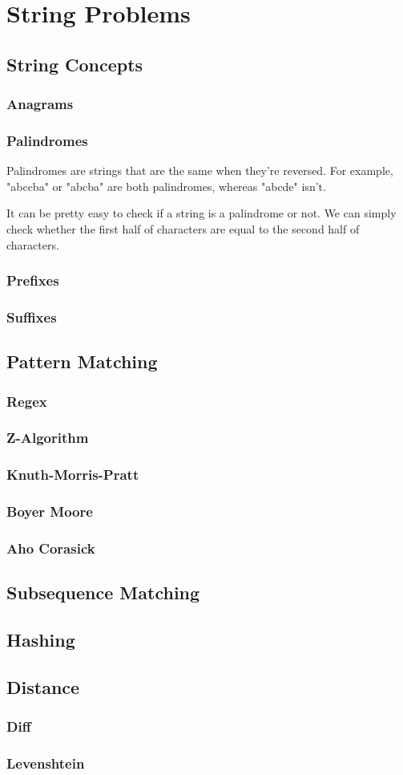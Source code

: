 \section{String Problems}
\subsection{String Concepts}
\subsubsection{Anagrams}
\subsubsection{Palindromes}

Palindromes are strings that are the same when they're reversed. For example, "abccba" or "abcba" are both palindromes, whereas "abcde" isn't.

It can be pretty easy to check if a string is a palindrome or not. We can simply check whether the first half of characters are equal to the second half of characters.

\subsubsection{Prefixes}
\subsubsection{Suffixes}
\subsection{Pattern Matching}
\subsubsection{Regex}
\subsubsection{Z-Algorithm}
\subsubsection{Knuth-Morris-Pratt}
\subsubsection{Boyer Moore}
\subsubsection{Aho Corasick}
\subsection{Subsequence Matching}
\subsection{Hashing}
\subsection{Distance}
\subsubsection{Diff}
\subsubsection{Levenshtein}